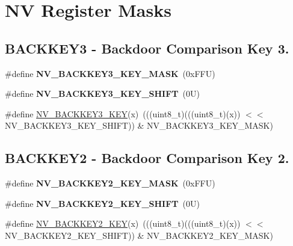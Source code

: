 \hypertarget{group___n_v___register___masks}{}\section{NV Register Masks}
\label{group___n_v___register___masks}
\subsection*{B\+A\+C\+K\+K\+E\+Y3 -\/ Backdoor Comparison Key 3.}
\begin{DoxyCompactItemize}
\item 
\mbox{\label{group___n_v___register___masks_gabe9123bc8137627b30e4f75c757cfb95}} 
\#define {\bfseries N\+V\+\_\+\+B\+A\+C\+K\+K\+E\+Y3\+\_\+\+K\+E\+Y\+\_\+\+M\+A\+SK}~(0x\+F\+F\+U)
\item 
\mbox{\label{group___n_v___register___masks_ga78b75e37d984596ddd9053d2125a78ff}} 
\#define {\bfseries N\+V\+\_\+\+B\+A\+C\+K\+K\+E\+Y3\+\_\+\+K\+E\+Y\+\_\+\+S\+H\+I\+FT}~(0\+U)
\item 
\#define \mbox{\hyperlink{group___n_v___register___masks_ga2fa5913563629cd7c8b509cc87421687}{N\+V\+\_\+\+B\+A\+C\+K\+K\+E\+Y3\+\_\+\+K\+EY}}(x)~(((uint8\+\_\+t)(((uint8\+\_\+t)(x)) $<$$<$ N\+V\+\_\+\+B\+A\+C\+K\+K\+E\+Y3\+\_\+\+K\+E\+Y\+\_\+\+S\+H\+I\+FT)) \& N\+V\+\_\+\+B\+A\+C\+K\+K\+E\+Y3\+\_\+\+K\+E\+Y\+\_\+\+M\+A\+SK)
\end{DoxyCompactItemize}
\subsection*{B\+A\+C\+K\+K\+E\+Y2 -\/ Backdoor Comparison Key 2.}
\begin{DoxyCompactItemize}
\item 
\mbox{\label{group___n_v___register___masks_ga5bf8822b0b59a321d9b5c30eb1618704}} 
\#define {\bfseries N\+V\+\_\+\+B\+A\+C\+K\+K\+E\+Y2\+\_\+\+K\+E\+Y\+\_\+\+M\+A\+SK}~(0x\+F\+F\+U)
\item 
\mbox{\label{group___n_v___register___masks_ga408b1083508e784cba76d5be9b147a84}} 
\#define {\bfseries N\+V\+\_\+\+B\+A\+C\+K\+K\+E\+Y2\+\_\+\+K\+E\+Y\+\_\+\+S\+H\+I\+FT}~(0\+U)
\item 
\#define \mbox{\hyperlink{group___n_v___register___masks_gaca7b47cbaa596b76f92f926f40dcc80a}{N\+V\+\_\+\+B\+A\+C\+K\+K\+E\+Y2\+\_\+\+K\+EY}}(x)~(((uint8\+\_\+t)(((uint8\+\_\+t)(x)) $<$$<$ N\+V\+\_\+\+B\+A\+C\+K\+K\+E\+Y2\+\_\+\+K\+E\+Y\+\_\+\+S\+H\+I\+FT)) \& N\+V\+\_\+\+B\+A\+C\+K\+K\+E\+Y2\+\_\+\+K\+E\+Y\+\_\+\+M\+A\+SK)
\end{DoxyCompactItemize}
